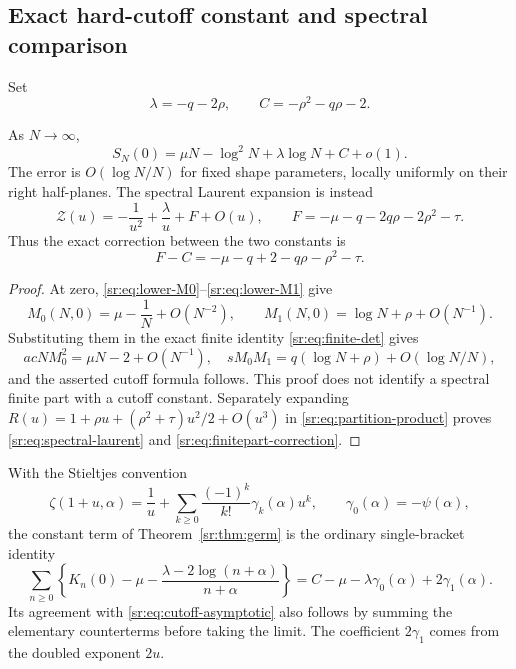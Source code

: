 \subsection{Exact hard-cutoff constant and spectral comparison}
Set
\begin{equation}\label{sr:eq:lambda-C}
 \lambda=-q-2\rho,\qquad C=-\rho^2-q\rho-2.
\end{equation}
\begin{theorem}
\label{sr:thm:constant}
As $N\to\infty$,
\begin{equation}\label{sr:eq:cutoff-asymptotic}
 \boxed{\displaystyle
 S_N(0)=\mu N-\log^2N+\lambda\log N+C+o(1).}
\end{equation}
The error is $O(\log N/N)$ for fixed shape parameters, locally uniformly
on their right half-planes. The spectral Laurent expansion is instead
\begin{equation}\label{sr:eq:spectral-laurent}
 \mathcal Z(u)=-\frac1{u^2}+\frac\lambda u+F+O(u),\qquad
 F=-\mu-q-2q\rho-2\rho^2-\tau.
\end{equation}
Thus the exact correction between the two constants is
\begin{equation}\label{sr:eq:finitepart-correction}
 F-C=-\mu-q+2-q\rho-\rho^2-\tau.
\end{equation}
\end{theorem}
\begin{proof}
At zero, \eqref{sr:eq:lower-M0}--\eqref{sr:eq:lower-M1} give
\[
 M_0(N,0)=\mu-\frac1N+O(N^{-2}),\qquad
 M_1(N,0)=\log N+\rho+O(N^{-1}).
\]
Substituting them in the exact finite identity
\eqref{sr:eq:finite-det} gives
\[
 acNM_0^2=\mu N-2+O(N^{-1}),\quad
 sM_0M_1=q(\log N+\rho)+O(\log N/N),
\]
and the asserted cutoff formula follows. This proof does not identify
a spectral finite part with a cutoff constant. Separately expanding
$R(u)=1+\rho u+(\rho^2+\tau)u^2/2+O(u^3)$ in
\eqref{sr:eq:partition-product} proves \eqref{sr:eq:spectral-laurent}
and \eqref{sr:eq:finitepart-correction}.
\end{proof}

With the Stieltjes convention
\[
 \zeta(1+u,\alpha)=\frac1u+
 \sum_{k\ge0}\frac{(-1)^k}{k!}\gamma_k(\alpha)u^k,
 \qquad \gamma_0(\alpha)=-\psi(\alpha),
\]
the constant term of Theorem~\ref{sr:thm:germ} is the ordinary
single-bracket identity
\begin{equation}\label{sr:eq:D0}
 \boxed{\displaystyle
 \sum_{n\ge0}\left\{K_n(0)-\mu-
 \frac{\lambda-2\log(n+\alpha)}{n+\alpha}\right\}
 =C-\mu-\lambda\gamma_0(\alpha)+2\gamma_1(\alpha).}
\end{equation}
Its agreement with \eqref{sr:eq:cutoff-asymptotic} also follows by
summing the elementary counterterms before taking the limit. The
coefficient $2\gamma_1$ comes from the doubled exponent $2u$.

